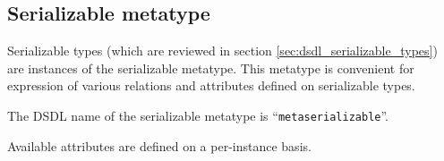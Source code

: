 \subsection{Serializable metatype}\label{sec:dsdl_metaserializable}

Serializable types (which are reviewed in section \ref{sec:dsdl_serializable_types})
are instances of the serializable metatype.
This metatype is convenient for expression of various relations and attributes defined on serializable types.

The DSDL name of the serializable metatype is ``\verb|metaserializable|''.

Available attributes are defined on a per-instance basis.
